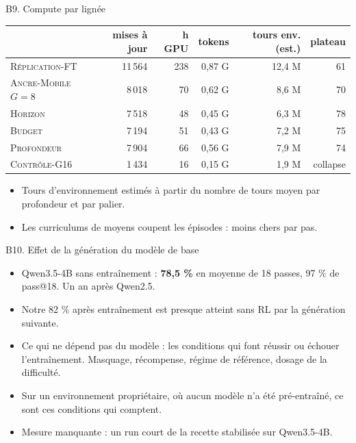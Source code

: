 \documentclass[aspectratio=169,10pt]{beamer}
\newcommand{\hl}[1]{\textcolor{crOrange}{\textbf{#1}}}
\begin{document}
\begin{frame}{B9. Compute par lignée}
\small
\begin{tabular}{@{}lrrrrr@{}}
\toprule
 & mises à jour & h GPU & tokens & tours env. (est.) & plateau \\
\midrule
\textsc{Réplication-FT} & 11\,564 & 238 & 0,87 G & 12,4 M & 61 \\
\textsc{Ancre-Mobile} $G{=}8$ & 8\,018 & 70 & 0,62 G & 8,6 M & 70 \\
\textsc{Horizon} & 7\,518 & 48 & 0,45 G & 6,3 M & 78 \\
\textsc{Budget} & 7\,194 & 51 & 0,43 G & 7,2 M & 75 \\
\textsc{Profondeur} & 7\,904 & 66 & 0,56 G & 7,9 M & 74 \\
\textsc{Contrôle-G16} & 1\,434 & 16 & 0,15 G & 1,9 M & collapse \\
\bottomrule
\end{tabular}
\vspace{0.3cm}
\begin{itemize}
  \item Tours d'environnement estimés à partir du nombre de tours moyen par profondeur et par palier.
  \item Les curriculums de moyens coupent les épisodes : moins chers par pas.
\end{itemize}
\end{frame}

\begin{frame}{B10. Effet de la génération du modèle de base}
\begin{itemize}
  \item Qwen3.5-4B sans entraînement : \hl{78,5 \%} en moyenne de 18 passes, 97 \% de pass@18. Un an après Qwen2.5.
  \item Notre 82 \% après entraînement est presque atteint sans RL par la génération suivante.
  \item Ce qui ne dépend pas du modèle : les conditions qui font réussir ou échouer l'entraînement. Masquage, récompense, régime de référence, dosage de la difficulté.
  \item Sur un environnement propriétaire, où aucun modèle n'a été pré-entraîné, ce sont ces conditions qui comptent.
  \item Mesure manquante : un run court de la recette stabilisée sur Qwen3.5-4B.
\end{itemize}
\end{frame}
\end{document}
